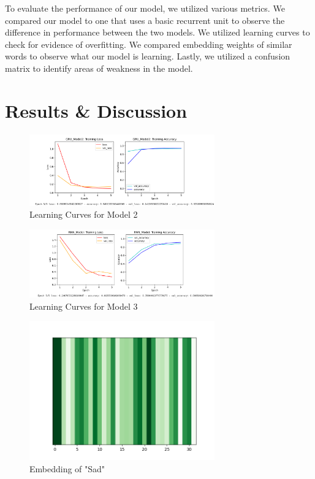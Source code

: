 \documentclass[11pt]{article}
\begin{document}
To evaluate the performance of our model, we utilized various metrics. We compared our model to one that uses a basic recurrent unit to observe the difference in performance between the two models. We utilized learning curves to check for evidence of overfitting. We compared embedding weights of similar words to observe what our model is learning. Lastly, we utilized a confusion matrix to identify areas of weakness in the model.

\section{Results \& Discussion}

\begin{figure}
    \begin{center}
    \includegraphics[width=8cm]{Model_2.png}
    \caption{Learning Curves for Model 2}
    \label{fig:height}
    \end{center}
\end{figure}

\begin{figure}
    \begin{center}
    \includegraphics[width=8cm]{Model_3.png}
    \caption{Learning Curves for Model 3}
    \label{fig:height}
    \end{center}
\end{figure}

\begin{figure}
    \begin{center}
    \includegraphics[width=8cm]{sad.png}
    \caption{Embedding of "Sad"}
    \label{fig:height}
    \end{center}
\end{figure}
\end{document}
